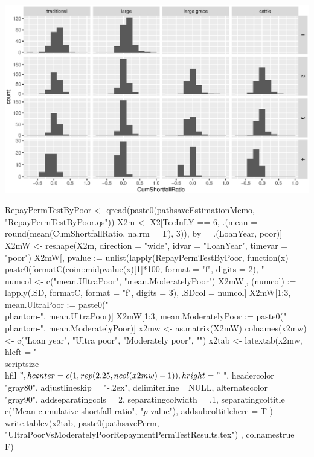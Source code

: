 \begin{Schunk}
{\centering \includegraphics[width=\maxwidth]{PermutationTests5/figureread_shortfall_data-1} 

}

\end{Schunk}
\begin{Schunk}
\begin{Sinput}
RepayPermTestByPoor <- qread(paste0(pathsaveEstimationMemo, "RepayPermTestByPoor.qs"))
X2m <- X2[TeeInLY == 6, .(mean = round(mean(CumShortfallRatio, na.rm = T), 3)), by = .(LoanYear, poor)] 
X2mW <- reshape(X2m, direction  = "wide", idvar = "LoanYear", timevar = "poor")
X2mW[, pvalue := unlist(lapply(RepayPermTestByPoor, 
  function(x) paste0(formatC(coin::midpvalue(x)[1]*100, format = "f", digits = 2), "\\%
numcol <- c("mean.UltraPoor", "mean.ModeratelyPoor")
X2mW[, (numcol) := lapply(.SD, formatC, format = "f", digits = 3), .SDcol = numcol]
X2mW[1:3, mean.UltraPoor := paste0("\\phantom{-}", mean.UltraPoor)]
X2mW[1:3, mean.ModeratelyPoor := paste0("\\phantom{-}", mean.ModeratelyPoor)]
x2mw <- as.matrix(X2mW)
colnames(x2mw) <- c("Loan year", "Ultra poor", "Moderately poor", "") 
x2tab <- latextab(x2mw, 
  hleft = "\\scriptsize\\hfil$", 
  hcenter = c(1, rep(2.25, ncol(x2mw)-1)), 
  hright = "$", 
  headercolor = "gray80", adjustlineskip = "-.2ex", delimiterline= NULL,
  alternatecolor = "gray90",
  addseparatingcols = 2, 
  separatingcolwidth = .1,
  separatingcoltitle = c("Mean cumulative shortfall ratio", "$p$ value"),
  addsubcoltitlehere = T
  )
write.tablev(x2tab,  
  paste0(pathsavePerm, "UltraPoorVsModeratelyPoorRepaymentPermTestResults.tex")
, colnamestrue = F)
\end{Sinput}
\end{Schunk}


